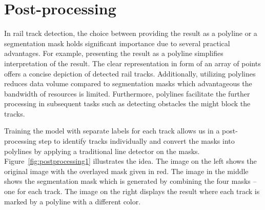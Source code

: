 \documentclass[Master,MDS,english]{BASE/twbook} %
\begin{document}
\section{Post-processing}

In rail track detection, the choice between providing the result as a polyline or a segmentation mask holds significant importance due to several practical advantages. For example, presenting the result as a polyline simplifies interpretation of the result. The clear representation in form of an array of points offers a concise depiction of detected rail tracks. Additionally, utilizing polylines reduces data volume compared to segmentation masks which advantageous the bandwidth of resources is limited. Furthermore, polylines facilitate the further processing in subsequent tasks such as detecting obstacles the might block the tracks. 

Training the model with separate labels for each track allows us in a post-processing step to identify tracks individually and convert the masks into polylines by applying a traditional line detector on the masks.  
Figure~\ref{fig:postprocessing1} illustrates the idea. The image on the left shows the original image with the overlayed mask given in red. The image in the middle shows the segmentation mask which is generated by combining the four masks -- one for each track. The image on the right displays the result where each track is marked by a polyline with a different color.
\end{document}
